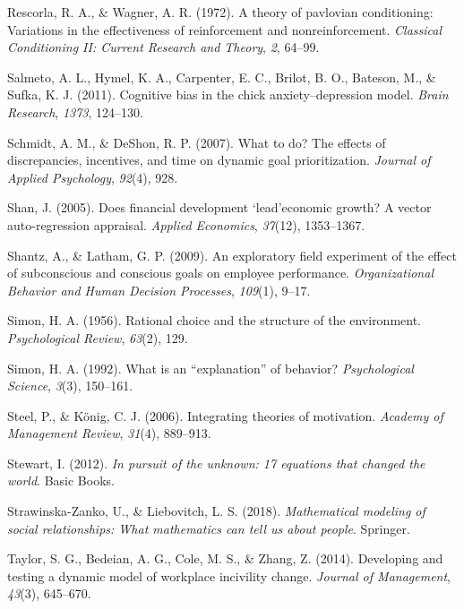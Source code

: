 \documentclass[english,,man]{apa6}
\theoremstyle{definition}
\theoremstyle{definition}
\theoremstyle{definition}
\theoremstyle{remark}
\begin{document}
\leavevmode\hypertarget{ref-rescorla1972}{}%
Rescorla, R. A., \& Wagner, A. R. (1972). A theory of pavlovian
conditioning: Variations in the effectiveness of reinforcement and
nonreinforcement. \emph{Classical Conditioning II: Current Research and
Theory}, \emph{2}, 64--99.

\leavevmode\hypertarget{ref-salmeto2011}{}%
Salmeto, A. L., Hymel, K. A., Carpenter, E. C., Brilot, B. O., Bateson,
M., \& Sufka, K. J. (2011). Cognitive bias in the chick
anxiety--depression model. \emph{Brain Research}, \emph{1373}, 124--130.

\leavevmode\hypertarget{ref-schmidt2007}{}%
Schmidt, A. M., \& DeShon, R. P. (2007). What to do? The effects of
discrepancies, incentives, and time on dynamic goal prioritization.
\emph{Journal of Applied Psychology}, \emph{92}(4), 928.

\leavevmode\hypertarget{ref-shan2005}{}%
Shan, J. (2005). Does financial development `lead'economic growth? A
vector auto-regression appraisal. \emph{Applied Economics},
\emph{37}(12), 1353--1367.

\leavevmode\hypertarget{ref-shantz2009}{}%
Shantz, A., \& Latham, G. P. (2009). An exploratory field experiment of
the effect of subconscious and conscious goals on employee performance.
\emph{Organizational Behavior and Human Decision Processes},
\emph{109}(1), 9--17.

\leavevmode\hypertarget{ref-simon1956}{}%
Simon, H. A. (1956). Rational choice and the structure of the
environment. \emph{Psychological Review}, \emph{63}(2), 129.

\leavevmode\hypertarget{ref-simon1992}{}%
Simon, H. A. (1992). What is an ``explanation'' of behavior?
\emph{Psychological Science}, \emph{3}(3), 150--161.

\leavevmode\hypertarget{ref-steel2006}{}%
Steel, P., \& König, C. J. (2006). Integrating theories of motivation.
\emph{Academy of Management Review}, \emph{31}(4), 889--913.

\leavevmode\hypertarget{ref-stewart2012}{}%
Stewart, I. (2012). \emph{In pursuit of the unknown: 17 equations that
changed the world}. Basic Books.

\leavevmode\hypertarget{ref-strawinska}{}%
Strawinska-Zanko, U., \& Liebovitch, L. S. (2018). \emph{Mathematical
modeling of social relationships: What mathematics can tell us about
people}. Springer.

\leavevmode\hypertarget{ref-taylor2014}{}%
Taylor, S. G., Bedeian, A. G., Cole, M. S., \& Zhang, Z. (2014).
Developing and testing a dynamic model of workplace incivility change.
\emph{Journal of Management}, \emph{43}(3), 645--670.
\end{document}
